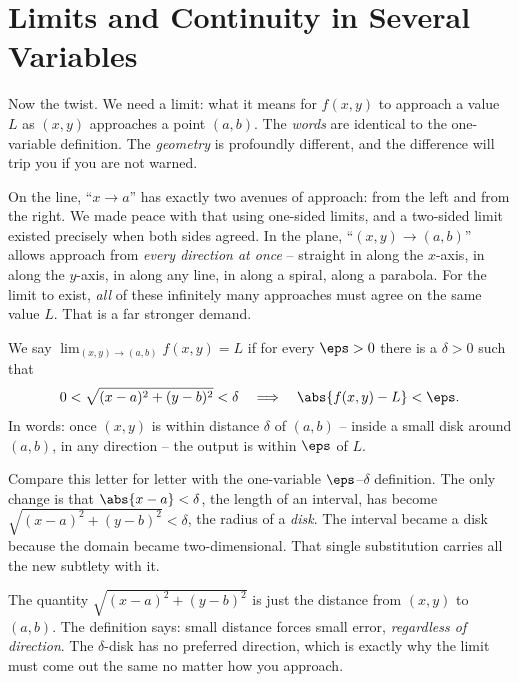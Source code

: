 \section{Limits and Continuity in Several Variables}
\label{ch32:sec-limits}

Now the twist. We need a limit: what it means for $f(x,y)$ to approach a value $L$ as $(x,y)$
approaches a point $(a,b)$. The \emph{words} are identical to the one-variable definition. The
\emph{geometry} is profoundly different, and the difference will trip you if you are not warned.

On the line, ``$x \to a$'' has exactly two avenues of approach: from the left and from the
right. We made peace with that using one-sided limits, and a two-sided limit existed precisely
when both sides agreed. In the plane, ``$(x,y)\to(a,b)$'' allows approach from \emph{every
direction at once} -- straight in along the $x$-axis, in along the $y$-axis, in along any line,
in along a spiral, along a parabola. For the limit to exist, \emph{all} of these infinitely
many approaches must agree on the same value $L$. That is a far stronger demand.

\begin{definition}
\label{ch32:def-limit}
We say $\displaystyle\lim_{(x,y)\to(a,b)} f(x,y) = L$ if for every $\eps>0$ there is a
$\delta>0$ such that
\[
   0 < \sqrt{(x-a)^2 + (y-b)^2} < \delta
   \quad\Longrightarrow\quad
   \abs{f(x,y) - L} < \eps .
\]
In words: once $(x,y)$ is within distance $\delta$ of $(a,b)$ -- inside a small disk around
$(a,b)$, in any direction -- the output is within $\eps$ of $L$.
\end{definition}

Compare this letter for letter with the one-variable $\eps$--$\delta$ definition. The only
change is that $\abs{x-a}<\delta$, the length of an interval, has become
$\sqrt{(x-a)^2+(y-b)^2}<\delta$, the radius of a \emph{disk}. The interval became a disk
because the domain became two-dimensional. That single substitution carries all the new
subtlety with it.

\begin{focusbox}
The quantity $\sqrt{(x-a)^2+(y-b)^2}$ is just the distance from $(x,y)$ to $(a,b)$. The
definition says: small distance forces small error, \emph{regardless of direction}. The
$\delta$-disk has no preferred direction, which is exactly why the limit must come out the
same no matter how you approach.
\end{focusbox}

